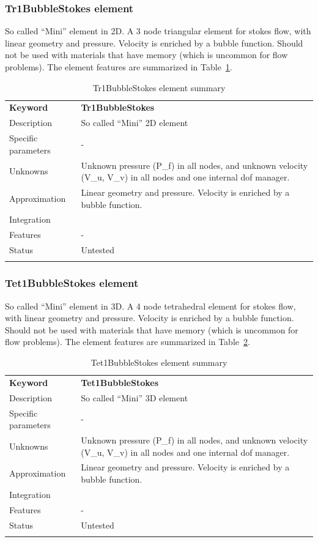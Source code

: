 \documentclass[a4paper]{article}
\newcommand{\param}[1]{\texttt{#1}} %
\newcommand{\templabel}{}%
\newcommand{\tempcaption}{}%
\newcounter{nelpar}
\newenvironment{elementsummary}[5]{%
  \gdef\tempcaption{#4}%
  \gdef\templabel{#5}%
  \setcounter{nelpar}{0}%
  \begin{center} %
    \begin{table}[!htb] %
      \begin{tabular}{|l|p{9cm}|}\hline %
        {\bf Keyword} & \bf{#1}\\ %
        {Description} & {#2}\\ %
        {Specific parameters} & {#3}\\ \hline %
}{
  \\ \hline %
      \end{tabular}%
      \caption{\tempcaption}%
      \label{\templabel}%
    \end{table}%
  \end{center}%
}
\newcommand{\elementParam}[1]{%
  \ifthenelse{\value{nelpar}>0} %
             {&{#1}}%
             {\setcounter{nelpar}{1}Parameters&{#1}}%
             \\%
}
\newcommand{\elementDescription}[2]{{#1} & {#2}\\}
\begin{document}
\subsubsection{Tr1BubbleStokes element}
So called ``Mini'' element in 2D. A 3 node triangular element for stokes flow, with linear geometry and pressure. Velocity is enriched by a bubble function.
Should not be used with materials that have memory (which is uncommon for flow problems). The element features are summarized in Table~\ref{Tr1BubbleStokessummary}.

\begin{elementsummary}{Tr1BubbleStokes}{So called ``Mini'' 2D element}{-}{Tr1BubbleStokes element summary}{Tr1BubbleStokessummary}
\elementDescription{Unknowns}{Unknown pressure (P\_f) in all nodes, and unknown velocity (V\_u, V\_v) in all nodes and one internal dof manager.}
\elementDescription{Approximation}{Linear geometry and pressure. Velocity is enriched by a bubble function.}
\elementDescription{Integration}{}
\elementDescription{Features}{-}
\elementDescription{Status}{Untested}
\end{elementsummary}

\subsubsection{Tet1BubbleStokes element}
So called ``Mini'' element in 3D. A 4 node tetrahedral element for stokes flow, with linear geometry and pressure. Velocity is enriched by a bubble function.
Should not be used with materials that have memory (which is uncommon for flow problems). The element features are summarized in Table~\ref{Tet1BubbleStokessummary}.

\begin{elementsummary}{Tet1BubbleStokes}{So called ``Mini'' 3D element}{-}{Tet1BubbleStokes element summary}{Tet1BubbleStokessummary}
\elementDescription{Unknowns}{Unknown pressure (P\_f) in all nodes, and unknown velocity (V\_u, V\_v) in all nodes and one internal dof manager.}
\elementDescription{Approximation}{Linear geometry and pressure. Velocity is enriched by a bubble function.}
\elementDescription{Integration}{}
\elementDescription{Features}{-}
\elementDescription{Status}{Untested}
\end{elementsummary}
\end{document}
